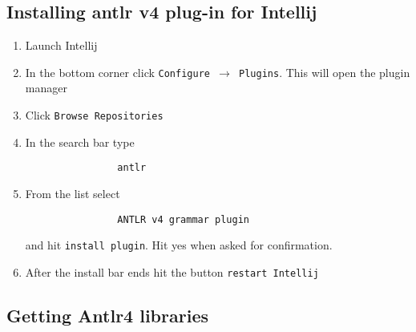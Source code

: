 \documentclass{article}
\begin{document}
	\subsection{Installing antlr v4 plug-in for Intellij}
		\begin{enumerate}
			\item Launch Intellij
			\item In the bottom corner click \texttt{Configure $\rightarrow$ Plugins}. This will open the plugin manager
			\item Click \texttt{Browse Repositories}
			\item In the search bar type
			\begin{lstlisting}
				antlr
			\end{lstlisting}
			\item From the list select
			\begin{lstlisting}
				ANTLR v4 grammar plugin
			\end{lstlisting}
			and hit \texttt{install plugin}. Hit yes when asked for confirmation.
			\item After the install bar ends hit the button \texttt{restart Intellij}
		\end{enumerate}


	\subsection{Getting Antlr4 libraries}
\end{document}
